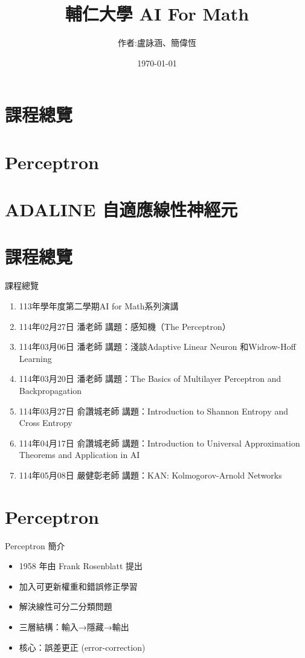 \documentclass{beamer}
\title{輔仁大學 AI For Math}
\author{作者:盧詠涵、簡偉恆}
\date{\today}
\begin{document}
\begin{frame}
  \titlepage
\end{frame}

\section{課程總覽}
\section{Perceptron}
\section{ADALINE 自適應線性神經元}

\section{課程總覽}
\begin{frame}{課程總覽}
\begin{enumerate}
    \item 113年學年度第二學期AI for Math系列演講
    \item 114年02月27日 潘老師 講題：感知機（The Perceptron）
    \item 114年03月06日 潘老師 講題：淺談Adaptive Linear Neuron 和Widrow-Hoff Learning
    \item 114年03月20日 潘老師 講題：The Basics of Multilayer Perceptron and Backpropagation
    \item 114年03月27日 俞讚城老師 講題：Introduction to Shannon Entropy and Cross Entropy
    \item 114年04月17日 俞讚城老師 講題：Introduction to Universal Approximation Theorems and Application in AI
    \item 114年05月08日 嚴健彰老師 講題：KAN: Kolmogorov-Arnold Networks
\end{enumerate}
\end{frame}

\section{Perceptron}
\begin{frame}{Perceptron 簡介}
  \begin{itemize}
    \item 1958 年由 Frank Rosenblatt 提出
    \item 加入可更新權重和錯誤修正學習
    \item 解決線性可分二分類問題
    \item 三層結構：輸入→隱藏→輸出
    \item 核心：誤差更正 (error-correction)
  \end{itemize}
\end{frame}
\end{document}
